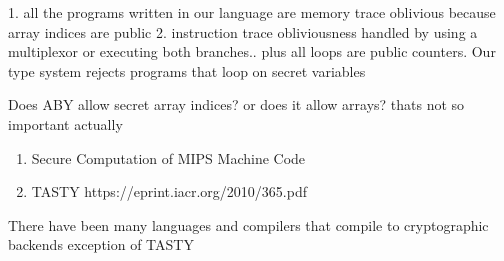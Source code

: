  1. all the programs written in our language are memory trace oblivious because array indices are public 2. instruction trace obliviousness handled by using a multiplexor or executing both branches.. plus all loops are public counters. Our type system rejects programs that loop on secret variables

 Does ABY allow secret array indices? or does it allow arrays? thats not so important actually

\begin{enumerate}
\item Secure Computation of MIPS Machine Code %
\item TASTY https://eprint.iacr.org/2010/365.pdf

\end{enumerate}


There have been many languages and compilers that compile to cryptographic backends
exception of TASTY


\newpage